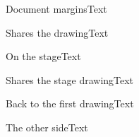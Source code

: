 \documentclass[aspectratio=169]{beamer}
\begin{document}
\begin{frame}{Document margins}Text\end{frame}
\begin{frame}{Shares the drawing}Text\end{frame}
\begin{frame}{On the stage}Text\end{frame}
\begin{frame}{Shares the stage drawing}Text\end{frame}
\begin{frame}{Back to the first drawing}Text\end{frame}
\begin{frame}{The other side}Text\end{frame}
\end{document}

